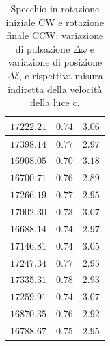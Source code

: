\documentclass[]{article}
\begin{document}
\begin{table}
\begin{tabular}{||c|c|c||}
            $17222.21$ & $0.74$ & $3.06$ \\\hline
            $17398.14$ & $0.77$ & $2.97$ \\\hline
            $16908.05$ & $0.70$ & $3.18$ \\\hline
            $16700.71$ & $0.76$ & $2.89$ \\\hline
            $17266.19$ & $0.77$ & $2.95$ \\\hline
            $17002.30$ & $0.73$ & $3.07$ \\\hline
            $16688.14$ & $0.74$ & $2.97$ \\\hline
            $17146.81$ & $0.74$ & $3.05$ \\\hline
            $17247.34$ & $0.77$ & $2.95$ \\\hline
            $17335.31$ & $0.78$ & $2.93$ \\\hline
            $17259.91$ & $0.74$ & $3.07$ \\\hline
            $16870.35$ & $0.76$ & $2.92$ \\\hline
            $16788.67$ & $0.75$ & $2.95$ \\\hline
        \end{tabular}
        \caption{Specchio in rotazione iniziale CW e rotazione finale CCW: variazione di pulsazione $\Delta\omega$ e variazione di posizione $\Delta\delta$, e rispettiva misura indiretta della velocità della luce $c$.}
        \label{CW_CCW-c}
    \end{table}
\end{document}
